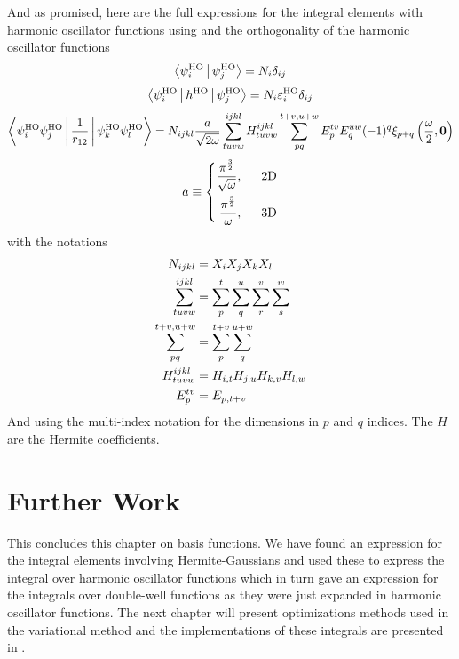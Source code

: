     And as promised, here are the full expressions for the integral elements with
    harmonic oscillator functions using  and the
    orthogonality of the harmonic oscillator functions
        \begin{equation}
            \Braket{\psiHO_i|\psiHO_j} = N_i \delta_{ij}
            \label{eq:HOoverlap}
        \end{equation}
        \begin{equation}
            \Braket{\psiHO_i|h^{\text{HO}}|\psiHO_j} = N_i
            \varepsilon^{\text{HO}}_i\delta_{ij}
        \end{equation}
        \begin{equation}
            \Braket{\psiHO_i\psiHO_j|\frac{1}{r_{12}}|\psiHO_k\psiHO_l} =
            N_{ijkl}\frac{a}{\sqrt{2\omega}}  \sum^{ijkl}_{tuvw}
            H^{ijkl}_{tuvw} \suml{pq}{t+v,u+w} E^{tv}_pE^{uw}_q
            (-1)^q\xi_{p+q}\left(\frac{\omega}{2}, \blds{0}\right)
        \end{equation}
        \begin{equation}
            a \equiv \left\{\begin{aligned}
                \frac{\pi^{\frac{3}{2}}} {\sqrt{\omega}},\indent \text{2D} \\
                \frac{\pi^{\frac{5}{2}}} {\omega},\indent \text{3D} \\
            \end{aligned}\right.
        \end{equation}
    with the notations
        \begin{equation}
            \begin{aligned}
                N_{ijkl} &= X_i X_j X_k X_l \\
                \suml{tuvw}{ijkl} &=
                \suml{p}{t}\suml{q}{u}\suml{r}{v}\suml{s}{w} \\
                \suml{pq}{t+v,u+w} &= \suml{p}{t+v}\suml{q}{u+w} \\
                H^{ijkl}_{tuvw} &= H_{i,t} H_{j,u} H_{k,v} H_{l,w} \\
                E^{tv}_p &= E_{p,t+v}
            \end{aligned}
        \end{equation}
    And using the multi-index notation for the dimensions in $p$ and $q$
    indices. The $H$ are the Hermite coefficients.

\section{Further Work}
    This concludes this chapter on basis functions. We have found an expression
    for the integral elements involving Hermite-Gaussians and used these to
    express the integral over harmonic oscillator functions which in turn gave
    an expression for the integrals over double-well functions as they were
    just expanded in harmonic oscillator functions. The next chapter will
    present optimizations methods used in the variational method and the
    implementations of these integrals are presented in .

